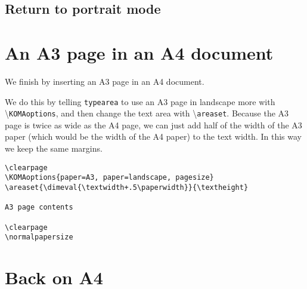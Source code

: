 \documentclass[twoside]{article}
\newcommand\cs[1]{\textbackslash\texttt{#1}}
\begin{document}
\subsection*{Return to portrait mode}

\lipsum[1-2]

\section{An A3 page in an A4 document}

We finish by inserting an A3 page in an A4 document.

We do this by telling \texttt{typearea} to use an A3 page in landscape more with \cs{KOMAoptions}, and then change the text area with \cs{areaset}.
Because the A3 page is twice as wide as the A4 page, we can just add half of the width of the A3 paper (which would be the width of the A4 paper) to the text width. In this way we keep the same margins.

\medskip

\noindent
\begin{boxedminipage}{\textwidth}
\begin{verbatim}
\clearpage
\KOMAoptions{paper=A3, paper=landscape, pagesize}
\areaset{\dimeval{\textwidth+.5\paperwidth}}{\textheight}

A3 page contents

\clearpage
\normalpapersize
\end{verbatim}
\end{boxedminipage}

\clearpage
{}
\areaset{\dimeval{\textwidth+.5\paperwidth}}{\textheight}

\setlength{\columnsep}{5cm}
\begin{multicols}{2}
  
\lipsum%

\end{multicols}

\clearpage
\normalpapersize

\section*{Back on A4}

\lipsum[1-3]%
\end{document}
